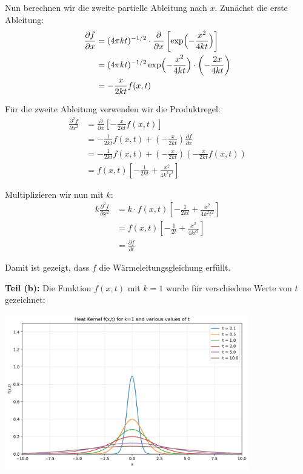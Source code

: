 \documentclass{article}
\begin{document}
Nun berechnen wir die zweite partielle Ableitung nach $x$. Zunächst die erste Ableitung:
\begin{align}
\frac{\partial f}{\partial x} &= (4\pi k t)^{-1/2} \cdot \frac{\partial}{\partial x}\left[\exp\Bigl(-\frac{x^2}{4kt}\Bigr)\right]\\
&= (4\pi k t)^{-1/2} \exp\Bigl(-\frac{x^2}{4kt}\Bigr) \cdot \left(-\frac{2x}{4kt}\right)\\
&= -\frac{x}{2kt} f(x,t)
\end{align}

Für die zweite Ableitung verwenden wir die Produktregel:
\begin{align}
\frac{\partial^2 f}{\partial x^2} &= \frac{\partial}{\partial x}\left[-\frac{x}{2kt} f(x,t)\right]\\
&= -\frac{1}{2kt} f(x,t) + \left(-\frac{x}{2kt}\right) \frac{\partial f}{\partial x}\\
&= -\frac{1}{2kt} f(x,t) + \left(-\frac{x}{2kt}\right) \left(-\frac{x}{2kt} f(x,t)\right)\\
&= f(x,t) \left[-\frac{1}{2kt} + \frac{x^2}{4k^2t^2}\right]
\end{align}

Multiplizieren wir nun mit $k$:
\begin{align}
k \frac{\partial^2 f}{\partial x^2} &= k \cdot f(x,t) \left[-\frac{1}{2kt} + \frac{x^2}{4k^2t^2}\right]\\
&= f(x,t) \left[-\frac{1}{2t} + \frac{x^2}{4kt^2}\right]\\
&= \frac{\partial f}{\partial t}
\end{align}

Damit ist gezeigt, dass $f$ die Wärmeleitungsgleichung erfüllt.

\textbf{Teil (b):} Die Funktion $f(x,t)$ mit $k=1$ wurde für verschiedene Werte von $t$ gezeichnet:

\begin{center}
\includegraphics[width=0.8\textwidth]{heat_kernel_plot.png}
\end{center}
\end{document}
